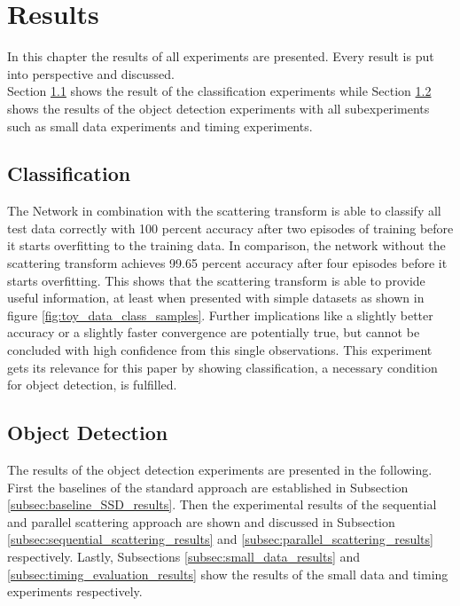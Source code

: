 \chapter{Results}
\label{chap:results}

In this chapter the results of all experiments are presented. Every result is put into perspective and discussed. \\
Section \ref{sec:classification_results} shows the result of the classification experiments while Section \ref{sec:object_detection_results} shows the results of the object detection experiments with all subexperiments such as small data experiments and timing experiments. 

\section{Classification}
\label{sec:classification_results}

The Network in combination with the scattering transform is able to classify all test data correctly with 100 percent accuracy after two episodes of training before it starts overfitting to the training data. In comparison, the network without the scattering transform achieves 99.65 percent accuracy after four episodes before it starts overfitting. This shows that the scattering transform is able to provide useful information, at least when presented with simple datasets as shown in figure \ref{fig:toy_data_class_samples}. Further implications like a slightly better accuracy or a slightly faster convergence are potentially true, but cannot be concluded with high confidence from this single observations. This experiment gets its relevance for this paper by showing classification, a necessary condition for object detection, is fulfilled.

\section{Object Detection}
\label{sec:object_detection_results}
The results of the object detection experiments are presented in the following. First the baselines of the standard approach are established in Subsection \ref{subsec:baseline_SSD_results}. Then the experimental results of the sequential and parallel scattering approach are shown and discussed in Subsection \ref{subsec:sequential_scattering_results} and \ref{subsec:parallel_scattering_results} respectively. Lastly, Subsections \ref{subsec:small_data_results} and \ref{subsec:timing_evaluation_results} show the results of the small data and timing experiments respectively. 

